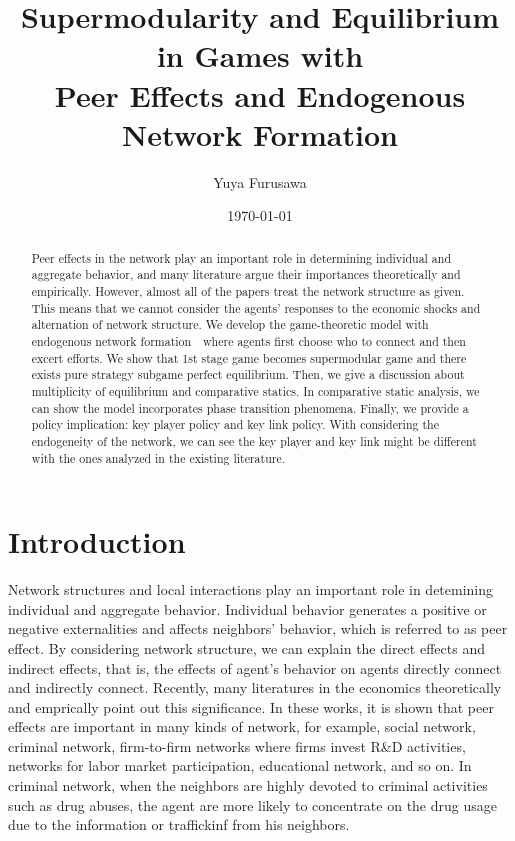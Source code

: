 \documentclass[12pt]{article}
\theoremstyle{definition}
\begin{document}
\title{Supermodularity and Equilibrium in Games with \\ Peer Effects and Endogenous Network Formation}

\author{Yuya Furusawa}

\date{\today}

\maketitle

\begin{abstract}
Peer effects in the network play an important role in determining individual and aggregate behavior, and many literature argue their importances theoretically and empirically.
However, almost all of the papers treat the network structure as given.
This means that we cannot consider the agents' responses to the economic shocks and alternation of network structure.
We develop the game-theoretic model with endogenous network formation　where agents first choose who to connect and then excert efforts.
We show that 1st stage game becomes supermodular game and there exists pure strategy subgame perfect equilibrium.
Then, we give a discussion about multiplicity of equilibrium and comparative statics.
In comparative static analysis, we can show the model incorporates phase transition phenomena.
Finally, we provide a policy implication: key player policy and key link policy.
With considering the endogeneity of the network, we can see the key player and key link might be different with the ones analyzed in the existing literature.
\end{abstract}


\section{Introduction}

Network structures and local interactions play an important role in detemining individual and aggregate behavior.
Individual behavior generates a positive or negative externalities and affects neighbors' behavior, which is referred to as peer effect.
By considering network structure, we can explain the direct effects and indirect effects, that is, the effects of agent's behavior on agents directly connect and indirectly connect.
Recently, many literatures in the economics theoretically and emprically point out this significance.
In these works, it is shown that peer effects are important in many kinds of network, for example, social network, criminal network, firm-to-firm networks where firms invest R\&D activities, networks for labor market participation, educational network, and so on.
In criminal network, when the neighbors are highly devoted to criminal activities such as drug abuses, the agent are more likely to concentrate on the drug usage due to the information or traffickinf from his neighbors.
\end{document}
